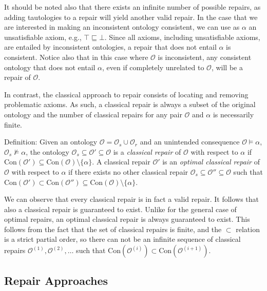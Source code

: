 \begin{example}
\end{example}

It should be noted also that there exists an infinite number of possible repairs, as adding tautologies to a repair will yield another valid repair. In the case that we are interested in making an inconsistent ontology consistent, we can use as $\alpha$ an unsatisfiable axiom, e.g., $\top \sqsubseteq \bot$. Since all axioms, including unsatisfiable axioms, are entailed by inconsistent ontologies, a repair that does not entail $\alpha$ is consistent. Notice also that in this case where $\mathcal{O}$ is inconsistent, any consistent ontology that does not entail $\alpha$, even if completely unrelated to $\mathcal{O}$, will be a repair of $\mathcal{O}$.

In contrast, the classical approach to repair consists of locating and removing problematic axioms. As such, a classical repair is always a subset of the original ontology and the number of classical repairs for any pair $\mathcal{O}$ and $\alpha$ is necessarily finite.

Definition: Given an ontology $\mathcal{O} = \mathcal{O}_s \cup \mathcal{O}_r$ and an unintended consequence $\mathcal{O} \vDash \alpha$, $\mathcal{O}_s \not\vDash \alpha$, the ontology $\mathcal{O}_s \subseteq \mathcal{O}' \subseteq \mathcal{O}$ is a \emph{classical repair} of $\mathcal{O}$ with respect to $\alpha$ if $\mathrm{Con}(\mathcal{O}') \subseteq \mathrm{Con}(\mathcal{O}) \setminus \{\alpha\}.$ A classical repair $\mathcal{O}'$ is an \emph{optimal classical repair} of $\mathcal{O}$ with respect to $\alpha$ if there exists no other classical repair $\mathcal{O}_s \subseteq \mathcal{O}'' \subseteq \mathcal{O}$ such that $\mathrm{Con}(\mathcal{O}') \subset \mathrm{Con}(\mathcal{O}'') \subseteq \mathrm{Con}(\mathcal{O}) \setminus \{\alpha\}$.

We can observe that every classical repair is in fact a valid repair. It follows that also a classical repair is guaranteed to exist. Unlike for the general case of optimal repairs, an optimal classical repair is always guaranteed to exist. This follows from the fact that the set of classical repairs is finite, and the $\subset$ relation is a strict partial order, so there can not be an infinite sequence of classical repairs $\mathcal{O}^{(1)}, \mathcal{O}^{(2)}, \dots$  such that $\mathrm{Con}(\mathcal{O}^{(i)}) \subset \mathrm{Con}(\mathcal{O}^{(i + 1)})$.

\subsection{Repair Approaches} \label{repair-approaches}

